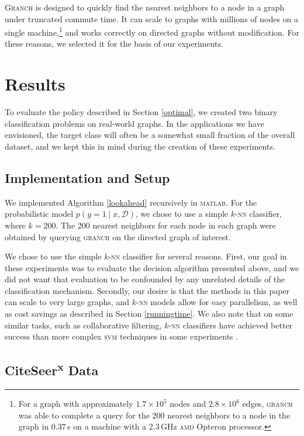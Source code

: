\documentclass{acm_proc_article-sp}
\newcommand{\cm}[1]{\mathcal{#1}}
\newcommand{\data}{\cm{D}}
\newcommand{\given}{\mid}
\begin{document}
\textsc{Granch} is designed to quickly find the nearest neighbors to a
node in a graph under truncated commute time.  It can scale to graphs
with millions of nodes on a single machine,\footnote{For a graph with
  approximately $1.7 \times 10^5$ nodes and $2.8 \times 10^6$ edges,
  \textsc{granch} was able to complete a query for the 200 nearest
  neighbors to a node in the graph in 0.37\,s on a machine with a
  2.3\,GHz \textsc{amd} Opteron processor.} and works correctly on
directed graphs without modification.  For these reasons, we selected
it for the basis of our experiments.

\section{Results}

To evaluate the policy described in Section \ref{optimal}, we created
two binary classification problems on real-world graphs.  In the
applications we have envisioned, the target class will often be a
somewhat small fraction of the overall dataset, and we kept this in
mind during the creation of these experiments.

\subsection{Implementation and Setup}

We implemented Algorithm \ref{lookahead} recursively in
\textsc{matlab}.  For the probabilistic model $p(y = 1 \given x,
\data)$, we chose to use a simple $k$-\textsc{nn} classifier,
where $k = 200$.  The 200 nearest neighbors for each node in each
graph were obtained by querying \textsc{granch} on the directed graph
of interest.

We chose to use the simple $k$-\textsc{nn} classifier for several
reasons.  First, our goal in these experiments was to evaluate the
decision algorithm presented above, and we did not want that
evaluation to be confounded by any unrelated details of the
classification mechanism.  Secondly, our desire is that the methods in
this paper can scale to very large graphs, and $k$-\textsc{nn} models
allow for easy parallelism, as well as cost savings as described in
Section \ref{runningtime}.  We also note that on some similar tasks,
such as collaborative filtering, $k$-\textsc{nn} classifiers have
achieved better success than more complex \textsc{svm} techniques in
some experiments \citep{knnvssvm}.

\subsection{CiteSeer\textsuperscript{\textbf{x}} Data}
\end{document}

